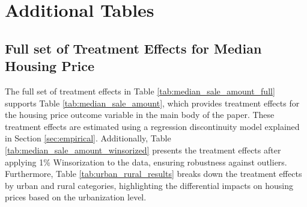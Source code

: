 \section{Additional Tables} \label{sec:appxa}

\subsection{Full set of Treatment Effects for Median Housing Price}

The full set of treatment effects in Table \ref{tab:median_sale_amount_full} supports Table \ref{tab:median_sale_amount}, which provides treatment effects for the housing price outcome variable in the main body of the paper. These treatment effects are estimated using a regression discontinuity model explained in Section \ref{sec:empirical}. Additionally, Table \ref{tab:median_sale_amount_winsorized} presents the treatment effects after applying 1\% Winsorization to the data, ensuring robustness against outliers. Furthermore, Table \ref{tab:urban_rural_results} breaks down the treatment effects by urban and rural categories, highlighting the differential impacts on housing prices based on the urbanization level.

